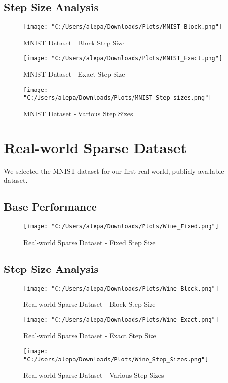 \documentclass{article}
\begin{document}
\subsection{Step Size Analysis}
\begin{figure}[H]
    \centering
    \texttt{[image: "C:/Users/alepa/Downloads/Plots/MNIST\_Block.png"]}
    \caption{MNIST Dataset - Block Step Size}
    \label{fig:mnist_block}
\end{figure}

\begin{figure}[H]
    \centering
    \texttt{[image: "C:/Users/alepa/Downloads/Plots/MNIST\_Exact.png"]}
    \caption{MNIST Dataset - Exact Step Size}
    \label{fig:mnist_exact}
\end{figure}

\begin{figure}[H]
    \centering
    \texttt{[image: "C:/Users/alepa/Downloads/Plots/MNIST\_Step\_sizes.png"]}
    \caption{MNIST Dataset - Various Step Sizes}
    \label{fig:mnist_step_sizes}
\end{figure}

\section{Real-world Sparse Dataset}
We selected the MNIST dataset for our first real-world, publicly available dataset. 
\subsection{Base Performance}
\begin{figure}[H]
    \centering
    \texttt{[image: "C:/Users/alepa/Downloads/Plots/Wine\_Fixed.png"]}
    \caption{Real-world Sparse Dataset - Fixed Step Size}
    \label{fig:wine_fixed}
\end{figure}

\subsection{Step Size Analysis}
\begin{figure}[H]
    \centering
    \texttt{[image: "C:/Users/alepa/Downloads/Plots/Wine\_Block.png"]}
    \caption{Real-world Sparse Dataset - Block Step Size}
    \label{fig:wine_block}
\end{figure}

\begin{figure}[H]
    \centering
    \texttt{[image: "C:/Users/alepa/Downloads/Plots/Wine\_Exact.png"]}
    \caption{Real-world Sparse Dataset - Exact Step Size}
    \label{fig:wine_exact}
\end{figure}

\begin{figure}[H]
    \centering
    \texttt{[image: "C:/Users/alepa/Downloads/Plots/Wine\_Step\_Sizes.png"]}
    \caption{Real-world Sparse Dataset - Various Step Sizes}
    \label{fig:wine_step_sizes}
\end{figure}
\end{document}
